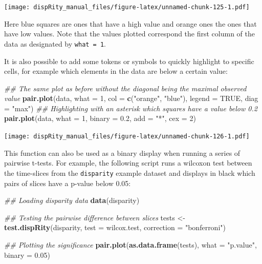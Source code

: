 \documentclass[]{book}
\newenvironment{Shaded}{\begin{snugshade}}{\end{snugshade}}
\newcommand{\CommentTok}[1]{\textcolor[rgb]{0.56,0.35,0.01}{\textit{#1}}}
\newcommand{\DataTypeTok}[1]{\textcolor[rgb]{0.13,0.29,0.53}{#1}}
\newcommand{\DecValTok}[1]{\textcolor[rgb]{0.00,0.00,0.81}{#1}}
\newcommand{\FloatTok}[1]{\textcolor[rgb]{0.00,0.00,0.81}{#1}}
\newcommand{\KeywordTok}[1]{\textcolor[rgb]{0.13,0.29,0.53}{\textbf{#1}}}
\newcommand{\NormalTok}[1]{#1}
\newcommand{\OtherTok}[1]{\textcolor[rgb]{0.56,0.35,0.01}{#1}}
\newcommand{\StringTok}[1]{\textcolor[rgb]{0.31,0.60,0.02}{#1}}
\begin{document}
\texttt{[image: dispRity\_manual\_files/figure-latex/unnamed-chunk-125-1.pdf]}

Here blue squares are ones that have a high value and orange ones the ones that have low values.
Note that the values plotted correspond the first column of the data as designated by \texttt{what\ =\ 1}.

It is also possible to add some tokens or symbols to quickly highlight to specific cells, for example which elements in the data are below a certain value:

\begin{Shaded}
\begin{Highlighting}[]
\CommentTok{## The same plot as before without the diagonal being the maximal observed value}
\KeywordTok{pair.plot}\NormalTok{(data, }\DataTypeTok{what =} \DecValTok{1}\NormalTok{, }\DataTypeTok{col =} \KeywordTok{c}\NormalTok{(}\StringTok{"orange"}\NormalTok{, }\StringTok{"blue"}\NormalTok{), }\DataTypeTok{legend =} \OtherTok{TRUE}\NormalTok{, }\DataTypeTok{diag =} \StringTok{"max"}\NormalTok{)}
\CommentTok{## Highlighting with an asterisk which squares have a value below 0.2}
\KeywordTok{pair.plot}\NormalTok{(data, }\DataTypeTok{what =} \DecValTok{1}\NormalTok{, }\DataTypeTok{binary =} \FloatTok{0.2}\NormalTok{, }\DataTypeTok{add =} \StringTok{"*"}\NormalTok{, }\DataTypeTok{cex =} \DecValTok{2}\NormalTok{)}
\end{Highlighting}
\end{Shaded}

\texttt{[image: dispRity\_manual\_files/figure-latex/unnamed-chunk-126-1.pdf]}

This function can also be used as a binary display when running a series of pairwise t-tests.
For example, the following script runs a wilcoxon test between the time-slices from the \texttt{disparity} example dataset and displays in black which pairs of slices have a p-value below 0.05:

\begin{Shaded}
\begin{Highlighting}[]
\CommentTok{## Loading disparity data}
\KeywordTok{data}\NormalTok{(disparity)}

\CommentTok{## Testing the pairwise difference between slices}
\NormalTok{tests <-}\StringTok{ }\KeywordTok{test.dispRity}\NormalTok{(disparity, }\DataTypeTok{test =}\NormalTok{ wilcox.test, }\DataTypeTok{correction =} \StringTok{"bonferroni"}\NormalTok{)}

\CommentTok{## Plotting the significance}
\KeywordTok{pair.plot}\NormalTok{(}\KeywordTok{as.data.frame}\NormalTok{(tests), }\DataTypeTok{what =} \StringTok{"p.value"}\NormalTok{, }\DataTypeTok{binary =} \FloatTok{0.05}\NormalTok{)}
\end{Highlighting}
\end{Shaded}
\end{document}
